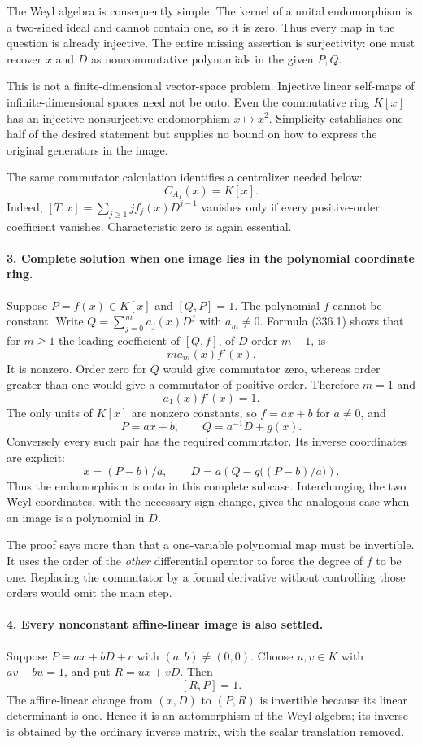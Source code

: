 \documentclass[11pt]{article}
\begin{document}
The Weyl algebra is consequently simple. The kernel of a unital endomorphism is a two-sided ideal and cannot contain one, so it is zero. Thus every map in the question is already injective. The entire missing assertion is surjectivity: one must recover $x$ and $D$ as noncommutative polynomials in the given $P,Q$.

This is not a finite-dimensional vector-space problem. Injective linear self-maps of infinite-dimensional spaces need not be onto. Even the commutative ring $K[x]$ has an injective nonsurjective endomorphism $x\mapsto x^2$. Simplicity establishes one half of the desired statement but supplies no bound on how to express the original generators in the image.

The same commutator calculation identifies a centralizer needed below:
\[
 C_{A_1}(x)=K[x].
 \tag{336.2}
\]
Indeed, $[T,x]=\sum_{j\ge1}j f_j(x)D^{j-1}$ vanishes only if every positive-order coefficient vanishes. Characteristic zero is again essential.

\paragraph{3. Complete solution when one image lies in the polynomial coordinate ring.}
Suppose $P=f(x)\in K[x]$ and $[Q,P]=1$. The polynomial $f$ cannot be constant. Write $Q=\sum_{j=0}^m a_j(x)D^j$ with $a_m\ne0$. Formula (336.1) shows that for $m\ge1$ the leading coefficient of $[Q,f]$, of $D$-order $m-1$, is
\[
 m a_m(x)f'(x).
\]
It is nonzero. Order zero for $Q$ would give commutator zero, whereas order greater than one would give a commutator of positive order. Therefore $m=1$ and
\[
 a_1(x)f'(x)=1.
\]
The only units of $K[x]$ are nonzero constants, so $f=ax+b$ for $a\ne0$, and
\[
 P=ax+b,\qquad Q=a^{-1}D+g(x).
 \tag{336.3}
\]
Conversely every such pair has the required commutator. Its inverse coordinates are explicit:
\[
 x=(P-b)/a,\qquad
 D=a\left(Q-g\bigl((P-b)/a\bigr)\right).
 \tag{336.4}
\]
Thus the endomorphism is onto in this complete subcase. Interchanging the two Weyl coordinates, with the necessary sign change, gives the analogous case when an image is a polynomial in $D$.

The proof says more than that a one-variable polynomial map must be invertible. It uses the order of the \emph{other} differential operator to force the degree of $f$ to be one. Replacing the commutator by a formal derivative without controlling those orders would omit the main step.

\paragraph{4. Every nonconstant affine-linear image is also settled.}
Suppose $P=ax+bD+c$ with $(a,b)\ne(0,0)$. Choose $u,v\in K$ with $av-bu=1$, and put $R=ux+vD$. Then
\[
 [R,P]=1.
\]
The affine-linear change from $(x,D)$ to $(P,R)$ is invertible because its linear determinant is one. Hence it is an automorphism of the Weyl algebra; its inverse is obtained by the ordinary inverse matrix, with the scalar translation removed.
\end{document}
